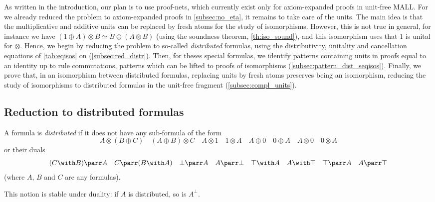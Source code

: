 \documentclass{lmcs}
\newcommand*{\orth}{^\perp} %
\newcommand*{\tens}{\otimes} %
\newcommand*{\iso}{\mathrel{\simeq}} %
\begin{document}
As written in the introduction, our plan is to use proof-nets, which currently exist only for axiom-expanded proofs in unit-free MALL.
For we already reduced the problem to axiom-expanded proofs in \autoref{subsec:no_eta}, it remains to take care of the units.
The main idea is that the multiplicative and additive units can be replaced by fresh atoms for the study of isomorphisms.
However, this is not true in general, for instance we have $(1\oplus A)\tens B \iso B\oplus(A\tens B)$ (using the soundness theorem, \autoref{th:iso_sound}), and this isomorphism uses that $1$ is unital for $\tens$.
Hence, we begin by reducing the problem to so-called \emph{distributed} formulas, using the distributivity, unitality and cancellation equations of \autoref{tab:eqisos} on  (\autoref{subsec:red_distr}).
Then, for theses special formulas, we identify patterns containing units in proofs equal to an identity up to rule commutations, patterns which can be lifted to proofs of isomorphisms (\autoref{subsec:pattern_dist_seqisos}).
Finally, we prove that, in an isomorphism between distributed formulas, replacing units by fresh atoms preserves being an isomorphism, reducing the study of isomorphisms to distributed formulas in the unit-free fragment (\autoref{subsec:compl_units}).

\subsection{Reduction to distributed formulas}
\label{subsec:red_distr}

\begin{defi}
\label{def:dist}
A formula is \emph{distributed} if it does not have any sub-formula of the form
\begin{equation*}
A\tens(B\oplus C)
\quad
(A\oplus B)\tens C
\quad
A\tens 1
\quad
1\tens A
\quad
A\oplus 0
\quad
0\oplus A
\quad
A\tens 0
\quad
0\tens A
\end{equation*}
or their duals
\begin{equation*}
(C\with B)\parr A
\quad
C\parr(B\with A)
\quad
\bot\parr A
\quad
A\parr\bot
\quad
\top\with A
\quad
A\with\top
\quad
\top\parr A
\quad
A\parr\top
\end{equation*}
(where $A$, $B$ and $C$ are any formulas).
\end{defi}

\begin{rem}
\label{rem:dist}
This notion is stable under duality: if $A$ is distributed, so is $A\orth$.
\end{rem}
\end{document}
